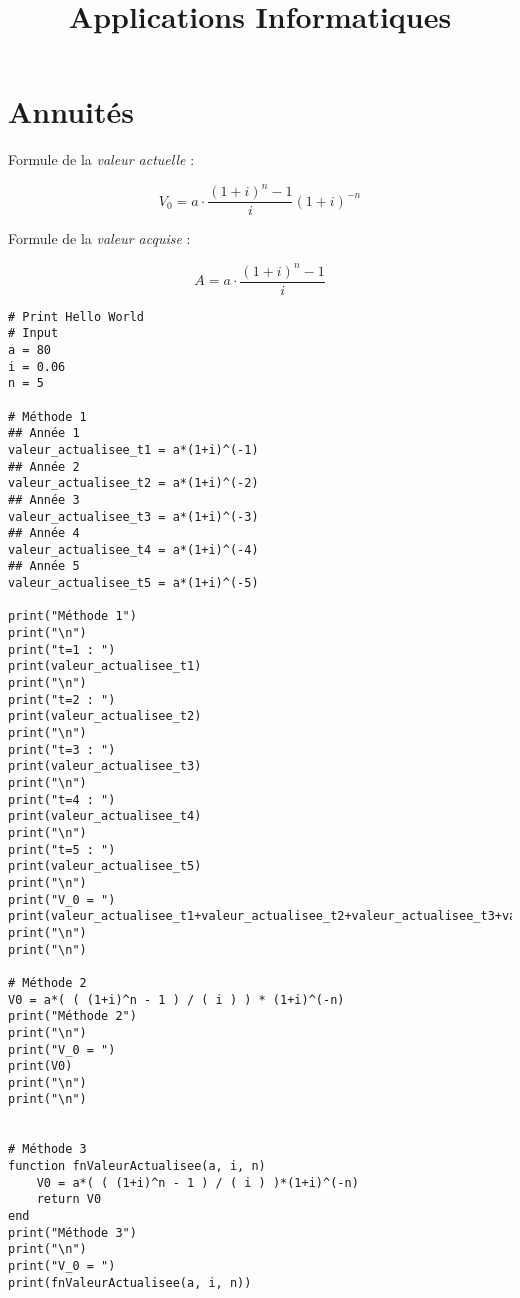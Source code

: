 \documentclass[11pt]{amsart}
\title{Applications Informatiques}
\author{}
\date{}
\begin{document}
\maketitle
\hypertarget{x-annuités}{\part*{Annuités}}
Formule de la \emph{valeur actuelle} :

\[
 \boxed{ V_0 = a \cdot \frac{ (1+i)^{n} - 1 }{ i } (1+i)^{-n} }
\]




Formule de la \emph{valeur acquise} :

\[
 \boxed{ A = a \cdot \frac{ (1+i)^{n} - 1 }{ i }  }
\]




\begin{verbatim}
# Print Hello World
# Input
a = 80
i = 0.06
n = 5

# Méthode 1
## Année 1
valeur_actualisee_t1 = a*(1+i)^(-1)
## Année 2
valeur_actualisee_t2 = a*(1+i)^(-2)
## Année 3
valeur_actualisee_t3 = a*(1+i)^(-3)
## Année 4
valeur_actualisee_t4 = a*(1+i)^(-4)
## Année 5
valeur_actualisee_t5 = a*(1+i)^(-5)

print("Méthode 1")
print("\n")
print("t=1 : ")
print(valeur_actualisee_t1)
print("\n")
print("t=2 : ")
print(valeur_actualisee_t2)
print("\n")
print("t=3 : ")
print(valeur_actualisee_t3)
print("\n")
print("t=4 : ")
print(valeur_actualisee_t4)
print("\n")
print("t=5 : ")
print(valeur_actualisee_t5)
print("\n")
print("V_0 = ")
print(valeur_actualisee_t1+valeur_actualisee_t2+valeur_actualisee_t3+valeur_actualisee_t4+valeur_actualisee_t5)
print("\n")
print("\n")

# Méthode 2
V0 = a*( ( (1+i)^n - 1 ) / ( i ) ) * (1+i)^(-n)
print("Méthode 2")
print("\n")
print("V_0 = ")
print(V0)
print("\n")
print("\n")


# Méthode 3
function fnValeurActualisee(a, i, n)
    V0 = a*( ( (1+i)^n - 1 ) / ( i ) )*(1+i)^(-n)
    return V0
end
print("Méthode 3")
print("\n")
print("V_0 = ")
print(fnValeurActualisee(a, i, n))
\end{verbatim}
\end{document}
